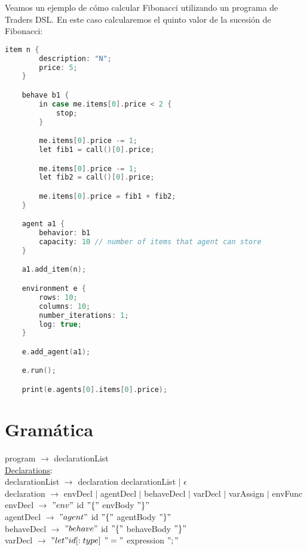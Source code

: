 \documentclass{article}
\begin{document}
Veamos un ejemplo de cómo calcular Fibonacci utilizando un programa de Traders DSL. En este caso calcularemos el quinto valor de la sucesión de Fibonacci:

\begin{lstlisting}[language=c]
	item n {
		description: "N";
		price: 5;
	}	

	behave b1 {
		in case me.items[0].price < 2 {
			stop;
		}

		me.items[0].price -= 1;
		let fib1 = call()[0].price;

		me.items[0].price -= 1;
		let fib2 = call()[0].price;

		me.items[0].price = fib1 + fib2;
	}

	agent a1 {
		behavior: b1
		capacity: 10 // number of items that agent can store
	}

	a1.add_item(n);

	environment e {
		rows: 10;
		columns: 10;
		number_iterations: 1;
		log: true;
	}

	e.add_agent(a1);

	e.run();

	print(e.agents[0].items[0].price);

\end{lstlisting}


\section{Gramática}

program $\rightarrow$ declarationList \\

\underline{Declarations}: \\

declarationList $\rightarrow$ declaration declarationList  $\vert$ $\epsilon$ \\

declaration $\rightarrow$ envDecl $\vert$ agentDecl $\vert$ behaveDecl $\vert$ varDecl $\vert$ varAssign $\vert$ envFunc\\

envDecl $\rightarrow$ $"env"$ id $"\{"$ envBody $"\}"$ \\

agentDecl $\rightarrow$ $"agent"$ id $"\{"$ agentBody $"\}"$ \\

behaveDecl $\rightarrow$ $"behave"$ id $"\{"$ behaveBody $"\}"$ \\

varDecl $\rightarrow$ $"let" id  [: type ]$ $"="$ expression $";"$ \\
\end{document}
